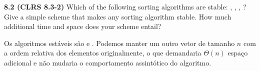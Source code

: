 
\noindent \textbf{8.2 (CLRS 8.3-2)} Which of the following sorting algorithms are stable: , , , ? Give a simple scheme that makes any sorting algorithm stable. How much additional time and space does your scheme entail?

Os algoritmos estáveis são  e . Podemos manter um outro vetor de tamanho $n$ com a ordem relativa dos elementos originalmente, o que demandaria $\Theta(n)$ espaço adicional e não mudaria o comportamento assintótico do algoritmo.\\[12pt]